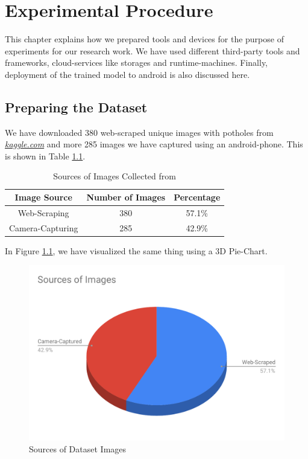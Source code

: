 \chapter{Experimental Procedure}
    This chapter explains how we prepared tools and devices for the purpose of experiments for our research work. We have used different third-party tools and frameworks, cloud-services like storages and runtime-machines. Finally, deployment of the trained model to android is also discussed here.
    
    \section{Preparing the Dataset}
        We have downloaded 380 web-scraped unique images with potholes from \href{https://kaggle.com}{\itshape{kaggle.com}} and more 285 images we have captured using an android-phone. This is shown in Table \ref{tab:img_sources}.
        
        \begin{table}[h]
            \centering
            \begin{tabular}{|c|c|c|} \hline
                Image Source &  Number of Images & Percentage \\\hline\hline
                Web-Scraping & 380 & 57.1\% \\\hline
                Camera-Capturing & 285 & 42.9\% \\\hline
            \end{tabular}
            \caption{Sources of Images Collected from}
            \label{tab:img_sources}
        \end{table}
        
        
        \vspace{1cm}
        In Figure \ref{fig:image_sources}, we have visualized the same thing using a 3D Pie-Chart.
        
        \begin{figure}
            \centering
            \includegraphics[width=\textwidth]{images/Sources of Images.pdf}
            \caption{Sources of Dataset Images}
            \label{fig:image_sources}
        \end{figure}
        
